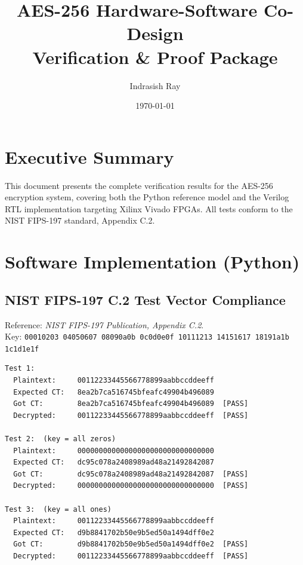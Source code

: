 \documentclass[11pt,a4paper]{article}
\begin{document}
\title{\vspace{-2em}\Huge\color{darkblue}AES-256 Hardware-Software Co-Design\\[0.3em]
       \large Verification \& Proof Package}
\author{Indrasish Ray}
\date{\today}
\maketitle
\vspace{-3em}

\section*{Executive Summary}
This document presents the complete verification results for the AES-256 encryption system, covering both the Python reference model and the Verilog RTL implementation targeting Xilinx Vivado FPGAs. All tests conform to the NIST FIPS-197 standard, Appendix C.2.

\vspace{0.5em}
\begin{minipage}{\textwidth}
\centering
{}
\end{minipage}

\section{Software Implementation (Python)}

\subsection{NIST FIPS-197 C.2 Test Vector Compliance}

Reference: \textit{NIST FIPS-197 Publication, Appendix C.2}.\\
Key: \texttt{00010203 04050607 08090a0b 0c0d0e0f 10111213 14151617 18191a1b 1c1d1e1f}

\begin{lstlisting}[style=terminal]
Test 1:
  Plaintext:     00112233445566778899aabbccddeeff
  Expected CT:   8ea2b7ca516745bfeafc49904b496089
  Got CT:        8ea2b7ca516745bfeafc49904b496089  [PASS]
  Decrypted:     00112233445566778899aabbccddeeff  [PASS]

Test 2:  (key = all zeros)
  Plaintext:     00000000000000000000000000000000
  Expected CT:   dc95c078a2408989ad48a21492842087
  Got CT:        dc95c078a2408989ad48a21492842087  [PASS]
  Decrypted:     00000000000000000000000000000000  [PASS]

Test 3:  (key = all ones)
  Plaintext:     00112233445566778899aabbccddeeff
  Expected CT:   d9b8841702b50e9b5ed50a1494dff0e2
  Got CT:        d9b8841702b50e9b5ed50a1494dff0e2  [PASS]
  Decrypted:     00112233445566778899aabbccddeeff  [PASS]
\end{lstlisting}
\end{document}

